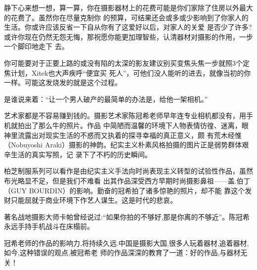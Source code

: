 ﻿\documentclass[12pt,a4paper,onecolumn]{article}
\begin{document}
静下心来想一想，算一算，你在摄影器材上的花费可能是你们家除了住房以外最大的花费了。虽然你在尽量克制你
的预算，可结果还会或多或少影响到了你家人的生活。你或许应该反省一下自从你有了这爱好以后，对家人的关爱
是否少了许多?或许你现在仍然无怨无悔，那祝愿你能更加理智些，认清器材对摄影的作用，一步一个脚印地走下
去。

你可能要对于正要上路的或没有陷的太深的影友建议别买变焦头焦一步就照3个定焦计划，Xitek也大声疾呼“便宜买
死人”，可他们没人能听的进去，就像当初的你一样。可能这发烧发的就是这个过程。

是谁说来着：“让一个男人破产的最简单的办法是，给他一架相机。” 

艺术家都是不容易赚到钱的。摄影艺术家陈冠希老师早年连专业相机都没有，用手机就拍出了那么牛的照片。作品
中简陋而温馨的环境下人物表情彷徨、迷离，眼神里流露出对现实生活的不惑而又执着的探寻幸福的真正意义，颇
有荒木经惟（Nobuyoshi Araki）摄影的神韵。纪实主义朴素风格拍摄的图片正是弱势群体艰辛生活的真实写照，记
录下了不朽的历史瞬间。

   
柏芝制服系列可以看作是由纪实主义手法向时尚表现主义转型的试验性作品，虽然布光略显不足，但是我们不难看
出其作品深受西方早期时尚摄影鼻祖——盖.伯丁（GUY BOURDIN）的影响。勤奋的冠希拍了诸多惊艳的照片，却不能
靠这个发财只能屈就于商业环境下作艺人谋生。这是时代的悲哀。

著名战地摄影大师卡帕曾经说过:“如果你拍的不够好,那是你离的不够近”。陈冠希永远手持手机战斗在床榻前。
   
冠希老师的作品的影响力,将持续久远.中国是摄影大国,很多人玩着器材,追着器材,如今,这种错误的观点,被冠希老
师的作品深深的教育了一道：好的作品,与器材无关！

\pagebreak

\renewcommand\listfigurename{附：本文插图}
\listoffigures
\end{document}
